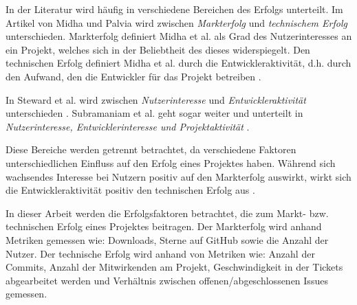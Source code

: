 

In der Literatur wird häufig in verschiedene Bereichen des Erfolgs unterteilt.
Im Artikel von Midha und Palvia wird zwischen \textit{Markterfolg} und \textit{technischem Erfolg} unterschieden.
Markterfolg definiert Midha et al.
als Grad des Nutzerinteresses an ein Projekt, %
welches sich in der Beliebtheit des dieses widerspiegelt.
Den technischen Erfolg definiert Midha et al.
durch die Entwickleraktivität, d.h. durch den Aufwand, den die Entwickler für das Projekt betreiben %
\cite{midhaFactorsAffectingSuccess2012}. %


In Steward et al. wird zwischen \textit{Nutzerinteresse} und \textit{Entwickleraktivität} unterschieden
\cite{stewartImpactsLicenseChoice2006a}. %
Subramaniam et al. geht sogar weiter und unterteilt in \textit{Nutzerinteresse, Entwicklerinteresse und Projektaktivität}
\cite{subramaniamDeterminantsOpenSource2009}. %

Diese Bereiche werden getrennt betrachtet, da verschiedene Faktoren unterschiedlichen Einfluss
auf den Erfolg eines Projektes haben.
Während sich wachsendes Interesse bei Nutzern positiv auf den Markterfolg auswirkt,
wirkt sich die Entwickleraktivität positiv den technischen Erfolg aus
\cite{midhaFactorsAffectingSuccess2012, %
    stewartImpactsLicenseChoice2006a}. %

In dieser Arbeit werden die Erfolgsfaktoren betrachtet, die zum Markt- bzw. technischen Erfolg
eines Projektes beitragen.
Der Markterfolg wird anhand Metriken gemessen wie:
Downloads, Sterne auf GitHub sowie die Anzahl der Nutzer.
Der technische Erfolg wird anhand von Metriken wie:
Anzahl der Commits, Anzahl der Mitwirkenden am Projekt,
Geschwindigkeit in der Tickets abgearbeitet werden und Verhältnis zwischen offenen/abgeschlossenen Issues gemessen.


